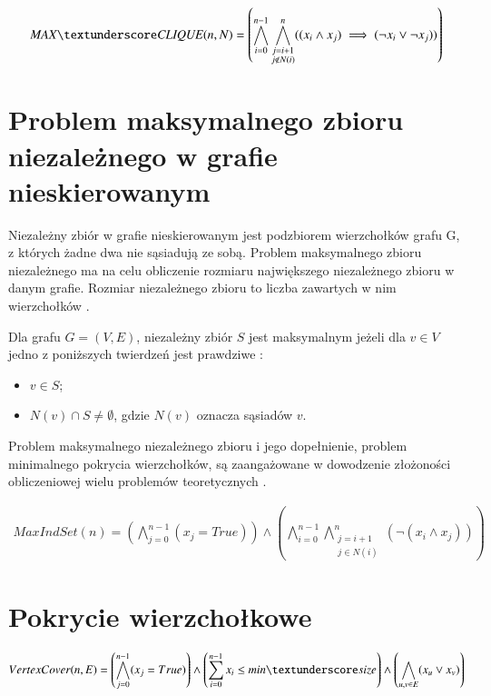 \begin{align*}
	\MAXCLIQUE(n, N) = 
	\left( \bigwedge_{i=0}^{n-1} \bigwedge_{\substack{j=i+1 \\ j \notin N(i)}}^{n} ((x_i \land x_j) \implies (\lnot x_i \lor \lnot x_j)) \right)	
\end{align*}

\section{Problem maksymalnego zbioru niezależnego w grafie nieskierowanym}

Niezależny zbiór w grafie nieskierowanym jest podzbiorem wierzchołków grafu G, z których żadne dwa nie sąsiadują ze sobą. Problem maksymalnego zbioru niezależnego ma na celu obliczenie rozmiaru największego niezależnego zbioru w danym grafie. Rozmiar niezależnego zbioru to liczba zawartych w nim wierzchołków \cite{Korshunov1974}.

Dla grafu $G = (V, E)$, niezależny zbiór \(S\) jest maksymalnym jeżeli dla $v \in V$ jedno z poniższych twierdzeń jest prawdziwe \cite{maxIndSetDef}:

\begin{itemize}
	\item $v \in S$;
	\item $N(v) \cap S \neq \emptyset$, gdzie \(N(v)\) oznacza sąsiadów \(v\).
\end{itemize}

Problem maksymalnego niezależnego zbioru i jego dopełnienie, problem minimalnego pokrycia wierzchołków, są zaangażowane w dowodzenie złożoności obliczeniowej wielu problemów teoretycznych \cite{Skiena20}.



\begin{align*}
	MaxIndSet(n) = \left( \bigwedge_{j=0}^{n-1} (x_j = True) \right) \land 
	\left( \bigwedge_{i=0}^{n-1} \bigwedge_{\substack{j=i+1 \\ j \in N(i)}}^{n} (\lnot(x_i \land x_j)) \right)	
\end{align*}

\section{Pokrycie wierzchołkowe}

\begin{align*}
	VertexCover(n, E) = \left( \bigwedge_{j=0}^{n-1} (x_j = True) \right) \land 
	\left( \sum_{i=0}^{n-1} x_i\leq min\textunderscore size \right) \land 
	\left( \bigwedge_{u, v \in E} (x_u \lor x_v) \right)
\end{align*}

